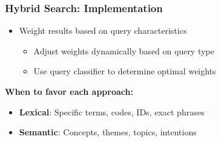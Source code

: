 \begin{frame}
    \frametitle{Hybrid Search: Implementation}
    \begin{itemize}
        \item Weight results based on query characteristics
        \begin{itemize}
            \item Adjust weights dynamically based on query type
            \item Use query classifier to determine optimal weights
        \end{itemize}
    \end{itemize}
    
    \vspace{0.3cm}
    \textbf{When to favor each approach:}
    \begin{itemize}
        \item \textbf{Lexical}: Specific terms, codes, IDs, exact phrases
        \item \textbf{Semantic}: Concepts, themes, topics, intentions
    \end{itemize}
    
    \vspace{0.3cm}
    \begin{center}
    \end{center}
\end{frame}


